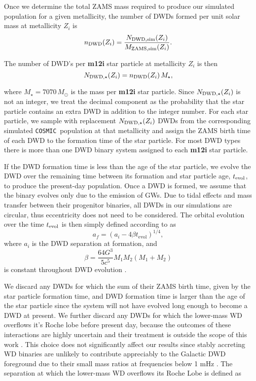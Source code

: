 \documentclass[twocolumn, linenumbers]{aastex631}
\newcommand{\cosmic}{\texttt{COSMIC}}
\begin{document}
Once we determine the total ZAMS mass required to produce our simulated population for a given metallicity, the number of DWDs formed per unit solar mass at metallicity $Z_i$ is
\begin{equation}
    n_{\rm{DWD}}(Z_i) = \frac{N_{\rm{DWD, sim}}(Z_i)}{M_{\rm{ZAMS, sim}}(Z_i)}.
\end{equation}

\noindent The number of DWD’s per \textbf{m12i} star particle at metallicity $Z_i$ is then
\begin{equation}
    N_{\rm{DWD},\star} (Z_i) = n_{\rm{DWD}}(Z_i)\, M_\star,
\end{equation}


\noindent where $M_\star = 7070\,M_\odot$ is the mass per \textbf{m12i} star particle. Since $N_{\rm{DWD},\star} (Z_i)$ is not an integer, we treat the decimal component as the probability that the star particle contains an extra DWD in addition to the integer number. For each star particle, we sample with replacement $N_{\rm{DWD},\star}(Z_i)$ DWDs from the corresponding simulated \cosmic\ population at that metallicity and assign the ZAMS birth time of each DWD to the formation time of the star particle. For most DWD types there is more than one DWD binary system assigned to each \textbf{m12i} star particle. 


If the DWD formation time is less than the age of the star particle, we evolve the DWD over the remaining time between its formation and star particle age, $t_{\rm{evol}}$, to produce the present-day population. Once a DWD is formed, we assume that the binary evolves only due to the emission of GWs. Due to tidal effects and mass transfer between their progenitor binaries, all DWDs in our simulations are circular, thus eccentricity does not need to be considered. The orbital evolution over the time $t_{\rm{evol}}$ is then simply defined according to \citet{Peters1964} as
\begin{equation}
    a_f = (a_i - 4\beta t_\text{evol})^{1/4},
\end{equation}
where $a_i$ is the DWD separation at formation, and 
\begin{equation}
    \beta = \frac{64G^3}{5c^5} M_1M_2(M_1+M_2)
\end{equation}
is constant throughout DWD evolution \citep{Peters1964}.

We discard any DWDs for which the sum of their ZAMS birth time, given by the star particle formation time, and DWD formation time is larger than the age of the star particle since the system will not have evolved long enough to become a DWD at present. We further discard any DWDs for which the lower-mass WD overflows it's Roche lobe before present day, because the outcomes of these interactions are highly uncertain and their treatment is outside the scope of this work \citep[e.g., ][]{Shen2015, Kremer2017}. This choice does not significantly affect our results since stably accreting WD binaries are unlikely to contribute appreciably to the Galactic DWD foreground due to their small mass ratios at frequencies below 1 mHz \citep{Breivik2018}. The separation at which the lower-mass WD overflows its Roche Lobe is defined as
\end{document}
